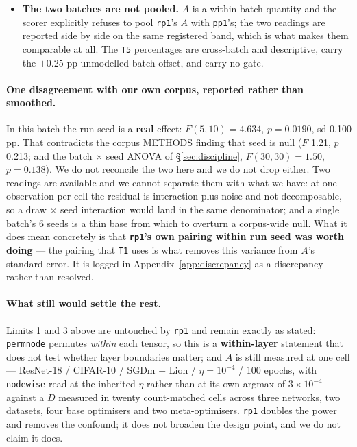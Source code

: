 \documentclass[10pt,letterpaper]{article}
\newcommand{\Dstat}{D}                         %
\newcommand{\Astat}{A}                         %
\newcommand{\arm}[1]{\texttt{#1}}
\begin{document}
\begin{itemize}
  CI does not (CI half-width 0.203, ratio 1.36), so the correct reading is \textbf{consistent with
  null, underpowered} --- the data are equally consistent with a true zero and with an alignment
  effect up to 0.222 pp, about a third of $\Dstat$. We do not write this as ``alignment does not
  matter''. The conclusion is unchanged in \emph{kind} and stronger in \emph{degree}: alignment is
  excluded as the principal carrier of $\Dstat$, and a contribution of up to roughly a third of
  $\Dstat$ remains open where before it was up to half.
\item \textbf{The two batches are not pooled.} $\Astat$ is a within-batch quantity and the scorer
  explicitly refuses to pool \arm{rp1}'s $\Astat$ with \arm{pp1}'s; the two readings are reported
  side by side on the same registered band, which is what makes them comparable at all. The
  \texttt{T5} percentages are cross-batch and descriptive, carry the $\pm 0.25$ pp unmodelled batch
  offset, and carry no gate.
\end{itemize}

\paragraph{One disagreement with our own corpus, reported rather than smoothed.}
In this batch the run seed is a \textbf{real} effect: $F(5,10) = 4.634$, $p = 0.0190$, sd 0.100 pp.
That contradicts the corpus METHODS finding that seed is null ($F$ 1.21, $p$ 0.213; and the
batch $\times$ seed ANOVA of \S\ref{sec:discipline}, $F(30,30) = 1.50$, $p = 0.138$). We do not
reconcile the two here and we do not drop either. Two readings are available and we cannot separate
them with what we have: at one observation per cell the residual is interaction-plus-noise and not
decomposable, so a draw $\times$ seed interaction would land in the same denominator; and a single
batch's 6 seeds is a thin base from which to overturn a corpus-wide null. What it does mean
concretely is that \textbf{\arm{rp1}'s own pairing within run seed was worth doing} --- the pairing
that \texttt{T1} uses is what removes this variance from $\Astat$'s standard error. It is logged in
Appendix~\ref{app:discrepancy} as a discrepancy rather than resolved.

\paragraph{What still would settle the rest.}
Limits 1 and 3 above are untouched by \arm{rp1} and remain exactly as stated: \arm{permnode}
permutes \emph{within} each tensor, so this is a \textbf{within-layer} statement that does not test
whether layer boundaries matter; and $\Astat$ is still measured at one cell --- ResNet-18 /
CIFAR-10 / SGDm $+$ Lion / $\eta = 10^{-4}$ / 100 epochs, with \arm{nodewise} read at the inherited
$\eta$ rather than at its own argmax of $3\times10^{-4}$ --- against a $\Dstat$ measured in twenty
count-matched cells across three networks, two datasets, four base optimisers and two
meta-optimisers. \arm{rp1} doubles
the power and removes the confound; it does not broaden the design point, and we do not claim it
does.
\end{document}
